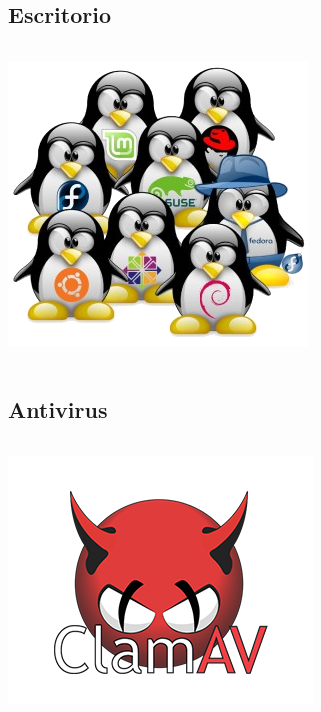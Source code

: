 \subsection{Escritorio}
\begin{frame}
    \begin{columns}
            \includegraphics[width=\textwidth]{distros.png}
    \end{columns}
\end{frame}

\subsection{Antivirus}
\begin{frame}
    \begin{columns}
            \includegraphics[width=\textwidth]{clamav.png}
    \end{columns}
\end{frame}

